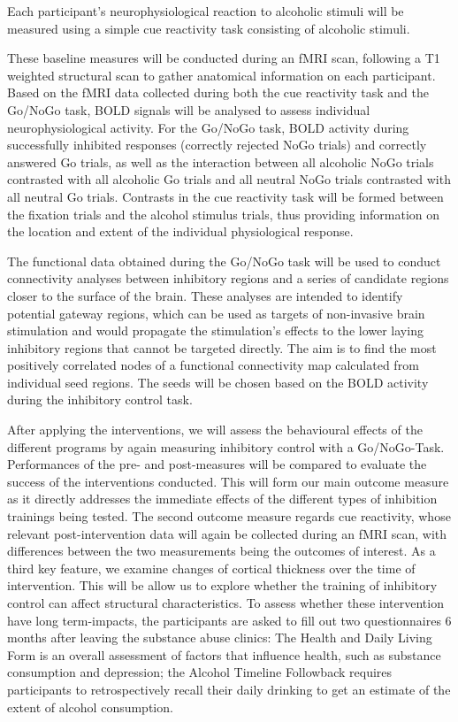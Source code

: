 \documentclass[12pt]{article}
\begin{document}
Each participant's neurophysiological reaction to alcoholic stimuli will be measured using a simple cue reactivity task consisting of alcoholic stimuli. 

These baseline measures will be conducted during an fMRI scan, following a T1 weighted structural scan to gather anatomical information on each participant. Based on the fMRI data collected during both the cue reactivity task and the Go/NoGo task, BOLD signals will be analysed to assess individual neurophysiological activity. For the Go/NoGo task, BOLD activity during successfully inhibited responses (correctly rejected NoGo trials) and correctly answered Go trials, as well as the interaction between all alcoholic NoGo trials contrasted with all alcoholic Go trials and all neutral NoGo trials contrasted with all neutral Go trials. Contrasts in the cue reactivity task will be formed between the fixation trials and the alcohol stimulus trials, thus providing information on the location and extent of the individual physiological response.

The functional data obtained during the Go/NoGo task will be used to conduct connectivity analyses between inhibitory regions and a series of candidate regions closer to the surface of the brain. These analyses are intended to identify potential gateway regions, which can be used as targets of non-invasive brain stimulation and would propagate the stimulation's effects to the lower laying inhibitory regions that cannot be targeted directly. The aim is to find the most positively correlated nodes of a functional connectivity map calculated from individual seed regions. The seeds will be chosen based on the BOLD activity during the inhibitory control task.

After applying the interventions, we will assess the behavioural effects of the different programs by again measuring inhibitory control with a Go/NoGo-Task. Performances of the pre- and post-measures will be compared to evaluate the success of the interventions conducted. This will form our main outcome measure as it directly addresses the immediate effects of the different types of inhibition trainings being tested.
The second outcome measure regards cue reactivity, whose relevant post-intervention data will again be collected during an fMRI scan, with differences between the two measurements being the outcomes of interest.
As a third key feature, we examine changes of cortical thickness over the time of intervention. This will be allow us to explore whether the training of inhibitory control can affect structural characteristics.
To assess whether these intervention have long term-impacts, the participants are asked to fill out two questionnaires 6 months after leaving the substance abuse clinics: The Health and Daily Living Form \parencite{moosHealthDailyLiving1986} is an overall assessment of factors that influence health, such as substance consumption and depression; the Alcohol Timeline Followback \parencite{sobellAlcoholTimelineFollowback1995} requires participants to retrospectively recall their daily drinking to get an estimate of the extent of alcohol consumption.
\end{document}
